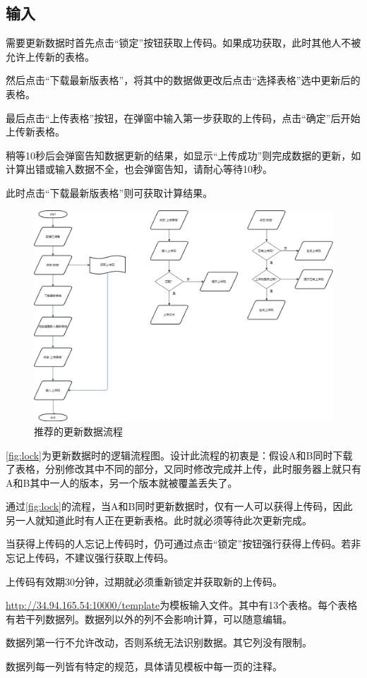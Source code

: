 \documentclass[UTF8,fontset=windowsnew]{ctexart}
\begin{document}
\subsection{输入}
需要更新数据时首先点击``锁定''按钮获取上传码。如果成功获取，此时其他人不被允许上传新的表格。\par
然后点击``下载最新版表格''，将其中的数据做更改后点击``选择表格''选中更新后的表格。\par
最后点击``上传表格''按钮，在弹窗中输入第一步获取的上传码，点击``确定''后开始上传新表格。\par
稍等10秒后会弹窗告知数据更新的结果，如显示``上传成功''则完成数据的更新，如计算出错或输入数据不全，也会弹窗告知，请耐心等待10秒。\par
此时点击``下载最新版表格''则可获取计算结果。\par
\begin{figure}[h]
  \centering
  \includegraphics[width=.8\textwidth]{image/lock.png}
  \caption{推荐的更新数据流程}
  \label{fig:lock}
\end{figure}
\autoref{fig:lock}为更新数据时的逻辑流程图。设计此流程的初衷是：假设A和B同时下载了表格，分别修改其中不同的部分，又同时修改完成并上传，此时服务器上就只有A和B其中一人的版本，另一个版本就被覆盖丢失了。\par
通过\autoref{fig:lock}的流程，当A和B同时更新数据时，仅有一人可以获得上传码，因此另一人就知道此时有人正在更新表格。此时就必须等待此次更新完成。\par
当获得上传码的人忘记上传码时，仍可通过点击``锁定''按钮强行获得上传码。若非忘记上传码，不建议强行获取上传码。\par
上传码有效期30分钟，过期就必须重新锁定并获取新的上传码。\par
\url{http://34.94.165.54:10000/template}为模板输入文件。其中有13个表格。每个表格有若干列数据列。数据列以外的列不会影响计算，可以随意编辑。\par
数据列第一行不允许改动，否则系统无法识别数据。其它列没有限制。\par
数据列每一列皆有特定的规范，具体请见模板中每一页的注释。
\end{document}
